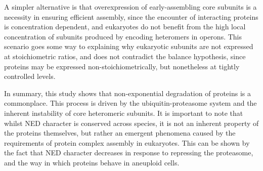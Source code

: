 \documentclass[a4paper,11pt,twoside,openright]{scrbook}
\begin{document}
A simpler alternative is that overexpression of early-assembling core subunits is a necessity in ensuring efficient assembly, since the encounter of interacting proteins is concentration dependent, and eukaryotes do not benefit from the high local concentration of subunits produced by encoding heteromers in operons. This scenario goes some way to explaining why eukaryotic subunits are not expressed at stoichiometric ratios, and does not contradict the balance hypothesis, since proteins may be expressed non-stoichiometrically, but nonetheless at tightly controlled levels.

In summary, this study shows that non-exponential degradation of proteins is a commonplace. This process is driven by the ubiquitin-proteasome system and the inherent instability of core heteromeric subunits. It is important to note that whilst NED character is conserved across species, it is not an inherent property of the proteins themselves, but rather an emergent phenomena caused by the requirements of protein complex assembly in eukaryotes. This can be shown by the fact that NED character decreases in response to repressing the proteasome, and the way in which proteins behave in aneuploid cells.

\end{document}
